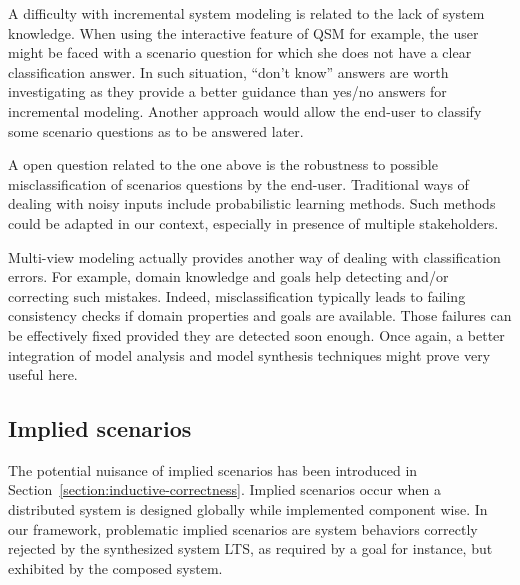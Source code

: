 A difficulty with incremental system modeling is related to the lack of system knowledge. When using the interactive feature of QSM for example, the user might be faced with a scenario question for which she does not have a clear classification answer. In such situation, ``don't know'' answers are worth investigating as they provide a better guidance than yes/no answers for incremental modeling. Another approach would allow the end-user to classify some scenario questions as to be answered later.

A open question related to the one above is the robustness to possible misclassification of scenarios questions by the end-user. Traditional ways of dealing with noisy inputs include probabilistic learning methods. Such methods could be adapted in our context, especially in presence of multiple stakeholders.

Multi-view modeling actually provides another way of dealing with classification errors. For example, domain knowledge and goals help detecting and/or correcting such mistakes. Indeed, misclassification typically leads to failing consistency checks if domain properties and goals are available. Those failures can be effectively fixed provided they are detected soon enough. Once again, a better integration of model analysis and model synthesis techniques might prove very useful here.

\subsection*{Implied scenarios}

The potential nuisance of implied scenarios has been introduced in Section~\ref{section:inductive-correctness}. Implied scenarios occur when a distributed system is designed globally while implemented component wise. In our framework, problematic implied scenarios are system behaviors correctly rejected by the synthesized system LTS, as required by a goal for instance, but exhibited by the composed system.

